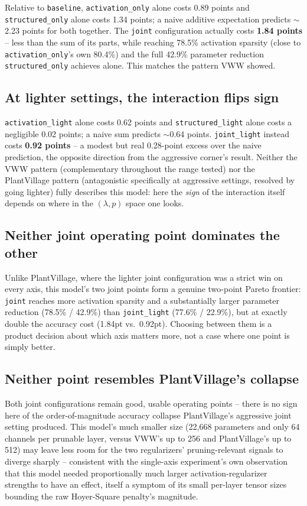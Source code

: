 \documentclass[11pt]{article}
\newcommand{\code}[1]{\texttt{#1}}
\begin{document}
Relative to \code{baseline}, \code{activation\_only} alone costs 0.89 points and \code{structured\_only} alone costs 1.34 points; a naive additive expectation predicts $\sim$2.23 points for both together. The \code{joint} configuration actually costs \textbf{1.84 points} -- less than the sum of its parts, while reaching 78.5\% activation sparsity (close to \code{activation\_only}'s own 80.4\%) and the full 42.9\% parameter reduction \code{structured\_only} achieves alone. This matches the pattern VWW showed.

\subsection{At lighter settings, the interaction flips sign}

\code{activation\_light} alone costs 0.62 points and \code{structured\_light} alone costs a negligible 0.02 points; a naive sum predicts $\sim$0.64 points. \code{joint\_light} instead costs \textbf{0.92 points} -- a modest but real 0.28-point excess over the naive prediction, the opposite direction from the aggressive corner's result. Neither the VWW pattern (complementary throughout the range tested) nor the PlantVillage pattern (antagonistic specifically at aggressive settings, resolved by going lighter) fully describes this model: here the \emph{sign} of the interaction itself depends on where in the $(\lambda, p)$ space one looks.

\subsection{Neither joint operating point dominates the other}

Unlike PlantVillage, where the lighter joint configuration was a strict win on every axis, this model's two joint points form a genuine two-point Pareto frontier: \code{joint} reaches more activation sparsity and a substantially larger parameter reduction (78.5\% / 42.9\%) than \code{joint\_light} (77.6\% / 22.9\%), but at exactly double the accuracy cost (1.84pt vs.\ 0.92pt). Choosing between them is a product decision about which axis matters more, not a case where one point is simply better.

\subsection{Neither point resembles PlantVillage's collapse}

Both joint configurations remain good, usable operating points -- there is no sign here of the order-of-magnitude accuracy collapse PlantVillage's aggressive joint setting produced. This model's much smaller size (22{,}668 parameters and only 64 channels per prunable layer, versus VWW's up to 256 and PlantVillage's up to 512) may leave less room for the two regularizers' pruning-relevant signals to diverge sharply -- consistent with the single-axis experiment's own observation that this model needed proportionally much larger activation-regularizer strengths to have an effect, itself a symptom of its small per-layer tensor sizes bounding the raw Hoyer-Square penalty's magnitude.
\end{document}
